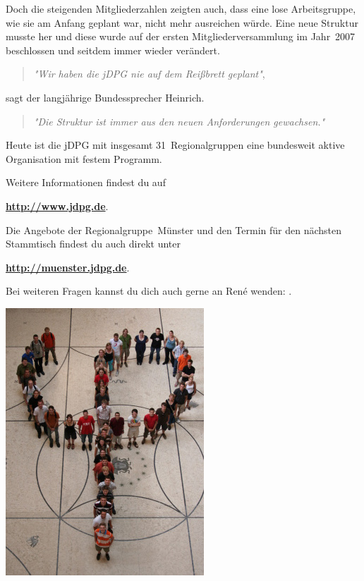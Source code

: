 \begin{multicols}{2}
Doch die steigenden Mitgliederzahlen zeigten auch, dass eine lose Arbeitsgruppe, wie sie am Anfang geplant war, nicht mehr ausreichen würde.
Eine neue Struktur musste her und diese wurde auf der ersten Mitgliederversammlung im Jahr~2007 beschlossen und seitdem immer wieder verändert.
\begin{quote}
	\textit{"Wir haben die jDPG nie auf dem Reißbrett geplant"},
\end{quote}
sagt der langjährige Bundessprecher Heinrich.
\begin{quote}
	\textit{"Die Struktur ist immer aus den neuen Anforderungen gewachsen."}
\end{quote}

Heute ist die jDPG mit insgesamt 31~Regionalgruppen eine bundesweit aktive Organisation mit festem Programm.

Weitere Informationen findest du auf
\begin{center}
	\textbf{\url{http://www.jdpg.de}}.
\end{center}

Die Angebote der Regionalgruppe~Münster und den Termin für den nächsten Stammtisch findest du auch direkt unter
\begin{center}
	\textbf{\url{http://muenster.jdpg.de}}.
\end{center}

Bei weiteren Fragen kannst du dich auch gerne an René wenden:
\textbf{}.

\begin{center}
	\includegraphics[width=\columnwidth]{res/jdpg_foto.png}
\end{center}


\end{multicols}
